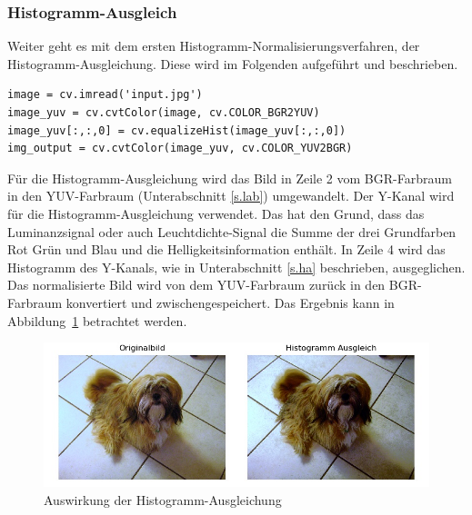 \subsubsection{Histogramm-Ausgleich}
Weiter geht es mit dem ersten Histogramm-Normalisierungsverfahren, der Histogramm-Ausgleichung. Diese wird im Folgenden aufgeführt und beschrieben.\\
\begin{lstlisting}
image = cv.imread('input.jpg')
image_yuv = cv.cvtColor(image, cv.COLOR_BGR2YUV)
image_yuv[:,:,0] = cv.equalizeHist(image_yuv[:,:,0])
img_output = cv.cvtColor(image_yuv, cv.COLOR_YUV2BGR)
\end{lstlisting}
Für die Histogramm-Ausgleichung \cite{histogram2012equalisation} wird das Bild in Zeile 2 vom BGR-Farbraum in den YUV-Farbraum (Unterabschnitt \ref{s.lab}) umgewandelt. Der Y-Kanal wird für die Histogramm-Ausgleichung verwendet. Das hat den Grund, dass das Luminanzsignal oder auch Leuchtdichte-Signal die Summe der drei Grundfarben Rot Grün und Blau und die Helligkeitsinformation enthält. In Zeile 4 wird das Histogramm des Y-Kanals, wie in Unterabschnitt \ref{s.ha} beschrieben, ausgeglichen. Das normalisierte Bild wird von dem YUV-Farbraum zurück in den BGR-Farbraum konvertiert und zwischengespeichert. Das Ergebnis kann in Abbildung~\ref{img:histogrameq} betrachtet werden.
\begin{figure}
	[h]
	\centering
	\includegraphics[scale=0.7]{Sources/histeq.jpg}
	\caption{Auswirkung der Histogramm-Ausgleichung}
	\label{img:histogrameq}
\end{figure}	
\newpage
